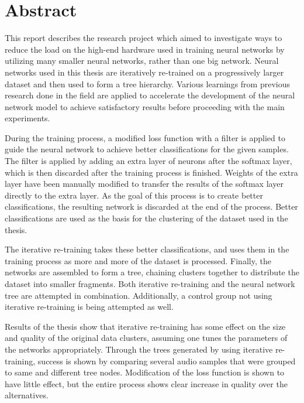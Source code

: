 \chapter*{Abstract}

This report describes the research project which aimed to investigate ways to reduce the load on the high-end hardware used in training neural networks by utilizing many smaller neural networks, rather than one big network.
Neural networks used in this thesis are iteratively re-trained on a progressively larger dataset and then used to form a tree hierarchy.
Various learnings from previous research done in the field are applied to accelerate the development of the neural network model to achieve satisfactory results before proceeding with the main experiments.

During the training process, a modified loss function with a filter is applied to guide the neural network to achieve better classifications for the given samples.
The filter is applied by adding an extra layer of neurons after the softmax layer, which is then discarded after the training process is finished.
Weights of the extra layer have been manually modified to transfer the results of the softmax layer directly to the extra layer.
As the goal of this process is to create better classifications, the resulting network is discarded at the end of the process.
Better classifications are used as the basis for the clustering of the dataset used in the thesis.

The iterative re-training takes these better classifications, and uses them in the training process as more and more of the dataset is processed.
Finally, the networks are assembled to form a tree, chaining clusters together to distribute the dataset into smaller fragments.
Both iterative re-training and the neural network tree are attempted in combination.
Additionally, a control group not using iterative re-training is being attempted as well.

Results of the thesis show that iterative re-training has some effect on the size and quality of the original data clusters, assuming one tunes the parameters of the networks appropriately.
Through the trees generated by using iterative re-training, success is shown by comparing several audio samples that were grouped to same and different tree nodes.
Modification of the loss function is shown to have little effect, but the entire process shows clear increase in quality over the alternatives.

